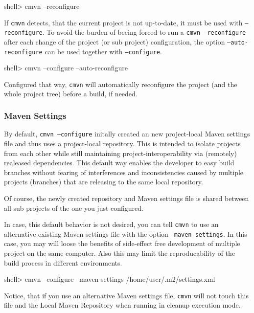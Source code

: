 \documentclass[a4paper,12pt,english,oneside,halfparskip]{scrartcl}
\newcommand{\cmvn}{\texttt{cmvn}}
\newcommand{\code}[1]{\texttt{#1}}
\begin{document}
\begin{Cmdline}
shell> cmvn --reconfigure
\end{Cmdline}

If \cmvn{} detects, that the current project is not up-to-date, it must be used with \code{--reconfigure}. To avoid the burden of beeing forced to run a \code{cmvn --reconfigure} after each change of the project (or sub project) configuration, the option \code{--auto-reconfigure} can be used together with \code{--configure}. 

\begin{Cmdline}
shell> cmvn --configure --auto-reconfigure
\end{Cmdline}

Configured that way, \cmvn{} will automatically reconfigure the project (and the whole project tree) before a build, if needed.

\subsubsection{Maven Settings}

By default, \code{cmvn --configure} initally created an new project-local Maven settings file and thus uses a project-local repository. This is intended to isolate projects from each other while still maintaining project-interoperability via (remotely) realeased dependencies. This default way enables the developer to easy build branches without fearing of interferences and inconsistencies caused by multiple projects (branches) that are releasing to the same local repository. 

Of course, the newly created repository and Maven settings file is shared between all sub projects of the one you just configured.

In case, this default behavior is not desired, you can tell \cmvn{} to use an alternative existing Maven settings file with the option \code{--maven-settings}. In this case, you may will loose the benefits of side-effect free development of multiple project on the same computer. Also this may limit the reproducability of the build process in different environments. 

\begin{Cmdline}
shell> cmvn --configure --maven-settings /home/user/.m2/settings.xml
\end{Cmdline}

Notice, that if you use an alternative Maven settings file, \cmvn{} will not touch this file and the Local Maven Repository when running in cleanup execution mode.
\end{document}
